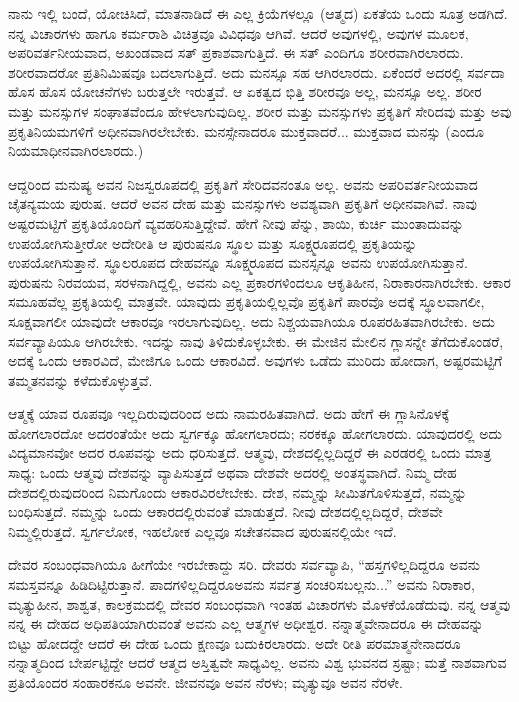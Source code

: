ನಾನು ಇಲ್ಲಿ ಬಂದೆ, ಯೋಚಿಸಿದೆ, ಮಾತನಾಡಿದೆ ಈ ಎಲ್ಲ ಕ್ರಿಯೆಗಳಲ್ಲೂ (ಆತ್ಮದ) ಏಕತೆಯ ಒಂದು ಸೂತ್ರ ಅಡಗಿದೆ. ನನ್ನ ವಿಚಾರಗಳು ಹಾಗೂ ಕರ್ಮರಾಶಿ ವಿಚಿತ್ರವೂ ವಿವಿಧವೂ ಆಗಿವೆ. ಆದರೆ ಅವುಗಳಲ್ಲಿ, ಅವುಗಳ ಮೂಲಕ, ಅಪರಿವರ್ತನೀಯವಾದ, ಅಖಂಡವಾದ ಸತ್ ಪ್ರಕಾಶವಾಗುತ್ತಿದೆ. ಈ ಸತ್ ಎಂದಿಗೂ ಶರೀರವಾಗಿರಲಾರದು. ಶರೀರವಾದರೋ ಪ್ರತಿನಿಮಿಷವೂ ಬದಲಾಗುತ್ತಿದೆ. ಅದು ಮನಸ್ಸೂ ಸಹ ಆಗಿರಲಾರದು. ಏಕೆಂದರೆ ಅದರಲ್ಲಿ ಸರ್ವದಾ ಹೊಸ ಹೊಸ ಯೋಚನೆಗಳು ಬರುತ್ತಲೇ ಇರುತ್ತವೆ. ಆ ಏಕತ್ವದ ಭಿತ್ತಿ ಶರೀರವೂ ಅಲ್ಲ, ಮನಸ್ಸೂ ಅಲ್ಲ. ಶರೀರ ಮತ್ತು ಮನಸ್ಸುಗಳ ಸಂಘಾತವೆಂದೂ ಹೇಳಲಾಗುವುದಿಲ್ಲ. ಶರೀರ ಮತ್ತು ಮನಸ್ಸುಗಳು ಪ್ರಕೃತಿಗೆ ಸೇರಿದವು ಮತ್ತು ಅವು ಪ್ರಕೃತಿನಿಯಮಗಳಿಗೆ ಅಧೀನವಾಗಿರಲೇಬೇಕು. ಮನಸ್ಸೇನಾದರೂ ಮುಕ್ತವಾದರೆ... ಮುಕ್ತವಾದ ಮನಸ್ಸು (ಎಂದೂ ನಿಯಮಾಧೀನವಾಗಿರಲಾರದು.)

\vskip 4pt

ಆದ್ದರಿಂದ ಮನುಷ್ಯ ಅವನ ನಿಜಸ್ವರೂಪದಲ್ಲಿ ಪ್ರಕೃತಿಗೆ ಸೇರಿದವನಂತೂ ಅಲ್ಲ. ಅವನು ಅಪರಿವರ್ತನೀಯವಾದ ಚೈತನ್ಯಮಯ ಪುರುಷ. ಆದರೆ ಅವನ ದೇಹ ಮತ್ತು ಮನಸ್ಸುಗಳು ಅವಶ್ಯವಾಗಿ ಪ್ರಕೃತಿಗೆ ಅಧೀನವಾಗಿವೆ. ನಾವು ಅಷ್ಟರಮಟ್ಟಿಗೆ ಪ್ರಕೃತಿಯೊಂದಿಗೆ ವ್ಯವಹರಿಸುತ್ತಿದ್ದೇವೆ. ಹೇಗೆ ನೀವು ಪೆನ್ನು, ಶಾಯಿ, ಕುರ್ಚಿ ಮುಂತಾದುವನ್ನು ಉಪಯೋಗಿಸುತ್ತೀರೋ ಅದೇರೀತಿ ಆ ಪುರುಷನೂ ಸ್ಥೂಲ ಮತ್ತು ಸೂಕ್ಷ್ಮರೂಪದಲ್ಲಿ ಪ್ರಕೃತಿಯನ್ನು ಉಪಯೋಗಿಸುತ್ತಾನೆ. ಸ್ಥೂಲರೂಪದ ದೇಹವನ್ನೂ ಸೂಕ್ಷ್ಮರೂಪದ ಮನಸ್ಸನ್ನೂ ಅವನು ಉಪಯೋಗಿಸುತ್ತಾನೆ. ಪುರುಷನು ನಿರವಯವ, ಸರಳನಾಗಿದ್ದಲ್ಲಿ, ಅವನು ಎಲ್ಲ ಪ್ರಕಾರಗಳಿಂದಲೂ ಆಕೃತಿಹೀನ, ನಿರಾಕಾರನಾಗಿರಬೇಕು. ಆಕಾರ ಸಮೂಹವೆಲ್ಲ ಪ್ರಕೃತಿಯಲ್ಲಿ ಮಾತ್ರವೇ. ಯಾವುದು ಪ್ರಕೃತಿಯಲ್ಲಿಲ್ಲವೊ ಪ್ರಕೃತಿಗೆ ಪಾರವೊ ಅದಕ್ಕೆ ಸ್ಥೂಲವಾಗಲೀ, ಸೂಕ್ಷವಾಗಲೀ ಯಾವುದೇ ಆಕಾರವೂ ಇರಲಾಗುವುದಿಲ್ಲ. ಅದು ನಿಶ್ಚಯವಾಗಿಯೂ ರೂಪರಹಿತವಾಗಿರಬೇಕು. ಅದು ಸರ್ವವ್ಯಾಪಿಯೂ ಆಗಿರಬೇಕು. ಇದನ್ನು ನಾವು ತಿಳಿದುಕೊಳ್ಳಬೇಕು. ಈ ಮೇಜಿನ ಮೇಲಿನ ಗ್ಲಾಸನ್ನೇ ತೆಗೆದುಕೊಂಡರೆ, ಅದಕ್ಕೆ ಒಂದು ಆಕಾರವಿದೆ, ಮೇಜಿಗೂ ಒಂದು ಆಕಾರವಿದೆ. ಅವುಗಳು ಒಡೆದು ಮುರಿದು ಹೋದಾಗ, ಅಷ್ಟರಮಟ್ಟಿಗೆ ತಮ್ಮತನವನ್ನು ಕಳೆದುಕೊಳ್ಳುತ್ತವೆ.

\vskip 4pt

ಆತ್ಮಕ್ಕೆ ಯಾವ ರೂಪವೂ ಇಲ್ಲದಿರುವುದರಿಂದ ಅದು ನಾಮರಹಿತವಾಗಿದೆ. ಅದು ಹೇಗೆ ಈ ಗ್ಲಾಸಿನೊಳಕ್ಕೆ ಹೋಗಲಾರದೋ ಅದರಂತೆಯೇ ಅದು ಸ್ವರ್ಗಕ್ಕೂ ಹೋಗಲಾರದು; ನರಕಕ್ಕೂ ಹೋಗಲಾರದು. ಯಾವುದರಲ್ಲಿ ಅದು ವಿದ್ಯಮಾನವೋ ಅದರ ರೂಪವನ್ನು ಅದು ಧರಿಸುತ್ತದೆ. ಆತ್ಮವು, ದೇಶದಲ್ಲಿಲ್ಲದಿದ್ದರೆ ಈ ಎರಡರಲ್ಲಿ ಒಂದು ಮಾತ್ರ ಸಾಧ್ಯ: ಒಂದು ಆತ್ಮವು ದೇಶವನ್ನು ವ್ಯಾಪಿಸುತ್ತದೆ ಅಥವಾ ದೇಶವೇ ಅದರಲ್ಲಿ ಅಂತಸ್ಥವಾಗಿದೆ. ನಿಮ್ಮ ದೇಹ ದೇಶದಲ್ಲಿರುವುದರಿಂದ ನಿಮಗೊಂದು ಆಕಾರವಿರಲೇಬೇಕು. ದೇಶ, ನಮ್ಮನ್ನು ಸೀಮಿತಗೊಳಿಸುತ್ತದೆ, ನಮ್ಮನ್ನು ಬಂಧಿಸುತ್ತದೆ. ನಮ್ಮನ್ನು ಒಂದು ಆಕಾರದಲ್ಲಿರುವಂತೆ ಮಾಡುತ್ತದೆ. ನೀವು ದೇಶದಲ್ಲಿಲ್ಲದಿದ್ದರೆ, ದೇಶವೇ ನಿಮ್ಮಲ್ಲಿರುತ್ತದೆ. ಸ್ವರ್ಗಲೋಕ, ಇಹಲೋಕ ಎಲ್ಲವೂ ಸಚೇತನವಾದ ಪುರುಷನಲ್ಲಿಯೇ ಇದೆ.

\vskip 4pt

ದೇವರ ಸಂಬಂಧವಾಗಿಯೂ ಹೀಗೆಯೇ ಇರಬೇಕಾದ್ದು ಸರಿ. ದೇವರು ಸರ್ವವ್ಯಾಪಿ, “ಹಸ್ತಗಳಿಲ್ಲದಿದ್ದರೂ ಅವನು ಸಮಸ್ತವನ್ನೂ ಹಿಡಿದಿಟ್ಟಿರುತ್ತಾನೆ. ಪಾದಗಳಿಲ್ಲದಿದ್ದರೂ\break ಅವನು ಸರ್ವತ್ರ ಸಂಚರಿಸಬಲ್ಲನು...'' ಅವನು ನಿರಾಕಾರ, ಮೃತ್ಯುಹೀನ, ಶಾಶ್ವತ, ಕಾಲಕ್ರಮದಲ್ಲಿ ದೇವರ ಸಂಬಂಧವಾಗಿ ಇಂತಹ ವಿಚಾರಗಳು ಮೊಳಕೆಯೊಡೆದುವು. ನನ್ನ ಆತ್ಮವು ನನ್ನ ಈ ದೇಹದ ಅಧಿಪತಿಯಾಗಿರುವಂತೆ ಅವನು ಎಲ್ಲ ಆತ್ಮಗಳ ಅಧೀಶ್ವರ. ನನ್ನಾತ್ಮವೇನಾದರೂ ಈ ದೇಹವನ್ನು ಬಿಟ್ಟು ಹೋದದ್ದೇ ಆದರೆ ಈ ದೇಹ ಒಂದು ಕ್ಷಣವೂ ಬದುಕಿರಲಾರದು. ಅದೇ ರೀತಿ ಪರಮಾತ್ಮನೇನಾದರೂ ನನ್ನಾತ್ಮದಿಂದ ಬೇರ್ಪಟ್ಟಿದ್ದೇ ಆದರೆ ಆತ್ಮದ ಅಸ್ತಿತ್ವವೇ ಸಾಧ್ಯವಿಲ್ಲ. ಅವನು ವಿಶ್ವ ಭುವನದ ಸ್ರಷ್ಟಾ; ಮತ್ತೆ ನಾಶವಾಗುವ ಪ್ರತಿಯೊಂದರ ಸಂಹಾರಕನೂ ಅವನೇ. ಜೀವನವೂ ಅವನ ನೆರಳು; ಮೃತ್ಯುವೂ ಅವನ ನೆರಳೇ.

